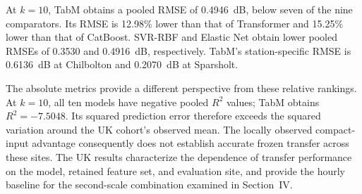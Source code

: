 

At $k=10$, TabM obtains a pooled RMSE of 0.4946~dB, below seven of the nine comparators. Its RMSE is 12.98\% lower than that of Transformer and 15.25\% lower than that of CatBoost. SVR-RBF and Elastic Net obtain lower pooled RMSEs of 0.3530 and 0.4916~dB, respectively. TabM's station-specific RMSE is 0.6136~dB at Chilbolton and 0.2070~dB at Sparsholt.

The absolute metrics provide a different perspective from these relative rankings. At $k=10$, all ten models have negative pooled $R^2$ values; TabM obtains $R^2=-7.5048$. Its squared prediction error therefore exceeds the squared variation around the UK cohort's observed mean. The locally observed compact-input advantage consequently does not establish accurate frozen transfer across these sites. The UK results characterize the dependence of transfer performance on the model, retained feature set, and evaluation site, and provide the hourly baseline for the second-scale combination examined in Section~IV.

